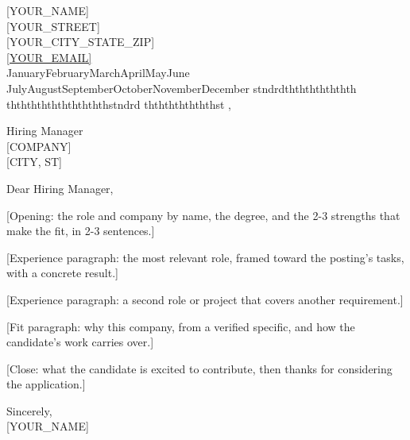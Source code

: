 \documentclass[letterpaper,11pt]{article}
\newcommand{\letterdate}{%
  \ifcase\month\or January\or February\or March\or April\or May\or June\or
  July\or August\or September\or October\or November\or December\fi
  \space\number\day
  \ifcase\day\or st\or nd\or rd\or th\or th\or th\or th\or th\or th\or th\or
  th\or th\or th\or th\or th\or th\or th\or th\or th\or th\or st\or nd\or rd\or
  th\or th\or th\or th\or th\or th\or th\or st\fi
  , \number\year}
\begin{document}
{[YOUR_NAME]}\\
{[YOUR_STREET]}\\
{[YOUR_CITY_STATE_ZIP]}\\
\href{mailto:[YOUR_EMAIL]}{\textcolor{linkblue}{\uline{[YOUR_EMAIL]}}}\\
\letterdate

Hiring Manager\\
{[COMPANY]}\\
{[CITY, ST]}

Dear Hiring Manager,

{[Opening: the role and company by name, the degree, and the 2-3 strengths that make the fit, in 2-3 sentences.]}

{[Experience paragraph: the most relevant role, framed toward the posting's tasks, with a concrete result.]}

{[Experience paragraph: a second role or project that covers another requirement.]}

{[Fit paragraph: why this company, from a verified specific, and how the candidate's work carries over.]}

{[Close: what the candidate is excited to contribute, then thanks for considering the application.]}

Sincerely,\\
{[YOUR_NAME]}
\end{document}

